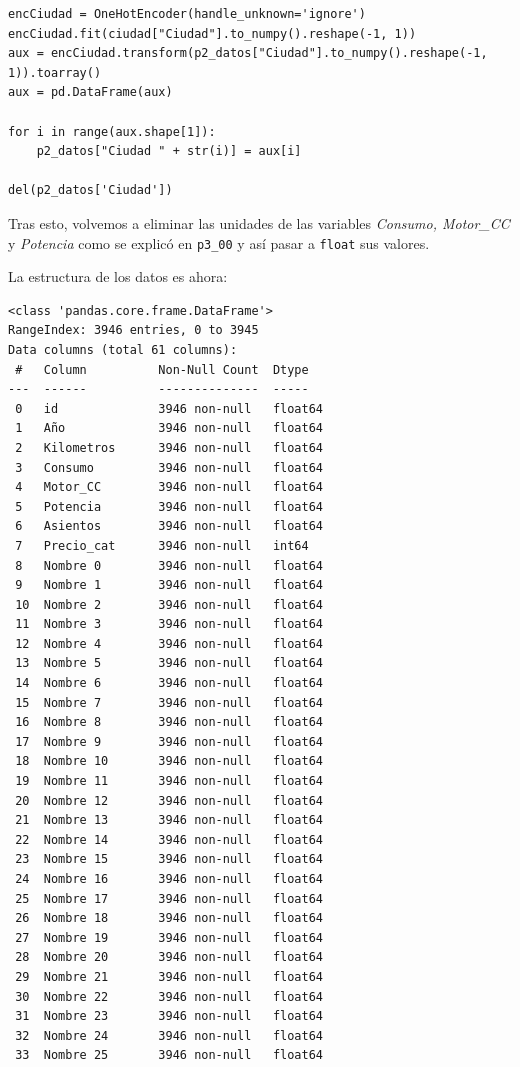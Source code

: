 \documentclass[a4]{article}
\begin{document}
\begin{lstlisting}
encCiudad = OneHotEncoder(handle_unknown='ignore')
encCiudad.fit(ciudad["Ciudad"].to_numpy().reshape(-1, 1))
aux = encCiudad.transform(p2_datos["Ciudad"].to_numpy().reshape(-1, 1)).toarray()
aux = pd.DataFrame(aux)

for i in range(aux.shape[1]):
    p2_datos["Ciudad " + str(i)] = aux[i]
    
del(p2_datos['Ciudad'])
\end{lstlisting}

Tras esto, volvemos a eliminar las unidades de las variables \textit{Consumo, Motor\_CC} y \textit{Potencia} como se explicó en \texttt{p3\_00} y así pasar a \texttt{float} sus valores.

La estructura de los datos es ahora:

\begin{verbatim}
<class 'pandas.core.frame.DataFrame'>
RangeIndex: 3946 entries, 0 to 3945
Data columns (total 61 columns):
 #   Column          Non-Null Count  Dtype  
---  ------          --------------  -----  
 0   id              3946 non-null   float64
 1   Año             3946 non-null   float64
 2   Kilometros      3946 non-null   float64
 3   Consumo         3946 non-null   float64
 4   Motor_CC        3946 non-null   float64
 5   Potencia        3946 non-null   float64
 6   Asientos        3946 non-null   float64
 7   Precio_cat      3946 non-null   int64  
 8   Nombre 0        3946 non-null   float64
 9   Nombre 1        3946 non-null   float64
 10  Nombre 2        3946 non-null   float64
 11  Nombre 3        3946 non-null   float64
 12  Nombre 4        3946 non-null   float64
 13  Nombre 5        3946 non-null   float64
 14  Nombre 6        3946 non-null   float64
 15  Nombre 7        3946 non-null   float64
 16  Nombre 8        3946 non-null   float64
 17  Nombre 9        3946 non-null   float64
 18  Nombre 10       3946 non-null   float64
 19  Nombre 11       3946 non-null   float64
 20  Nombre 12       3946 non-null   float64
 21  Nombre 13       3946 non-null   float64
 22  Nombre 14       3946 non-null   float64
 23  Nombre 15       3946 non-null   float64
 24  Nombre 16       3946 non-null   float64
 25  Nombre 17       3946 non-null   float64
 26  Nombre 18       3946 non-null   float64
 27  Nombre 19       3946 non-null   float64
 28  Nombre 20       3946 non-null   float64
 29  Nombre 21       3946 non-null   float64
 30  Nombre 22       3946 non-null   float64
 31  Nombre 23       3946 non-null   float64
 32  Nombre 24       3946 non-null   float64
 33  Nombre 25       3946 non-null   float64

\end{verbatim}
\end{document}

